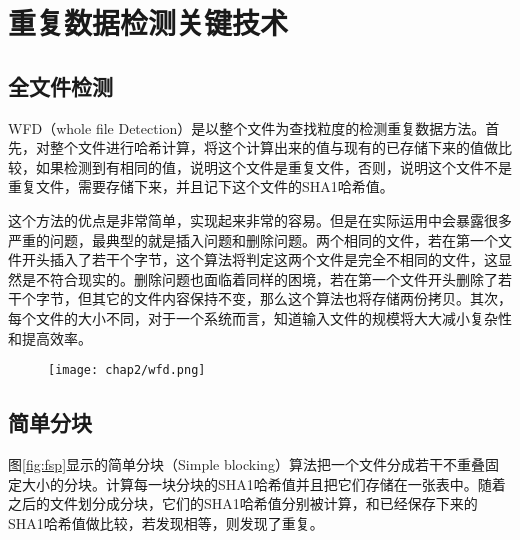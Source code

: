 
\chapter{重复数据检测关键技术}
\label{chap:tech}

\section{全文件检测}
\label{sec:WFD}

WFD（whole file Detection）是以整个文件为查找粒度的检测重复数据方法。首先，对整个文件进行哈希计算，将这个计算出来的值与现有的已存储下来的值做比较，如果检测到有相同的值，说明这个文件是重复文件，否则，说明这个文件不是重复文件，需要存储下来，并且记下这个文件的SHA1哈希值。

这个方法的优点是非常简单，实现起来非常的容易。但是在实际运用中会暴露很多严重的问题，最典型的就是插入问题和删除问题。两个相同的文件，若在第一个文件开头插入了若干个字节，这个算法将判定这两个文件是完全不相同的文件，这显然是不符合现实的。删除问题也面临着同样的困境，若在第一个文件开头删除了若干个字节，但其它的文件内容保持不变，那么这个算法也将存储两份拷贝。其次，每个文件的大小不同，对于一个系统而言，知道输入文件的规模将大大减小复杂性和提高效率。

\begin{figure}[!hbp]
    \begin{minipage}[b]{1\textwidth}
    \captionstyle{\centering}
    \centering
    \texttt{[image: chap2/wfd.png]}
    \end{minipage}     
\end{figure}

\section{简单分块}
\label{sec:simpleblock}

图\ref{fig:fsp}显示的简单分块（Simple blocking）算法把一个文件分成若干不重叠固定大小的分块。计算每一块分块的SHA1哈希值并且把它们存储在一张表中。随着之后的文件划分成分块，它们的SHA1哈希值分别被计算，和已经保存下来的SHA1哈希值做比较，若发现相等，则发现了重复。

